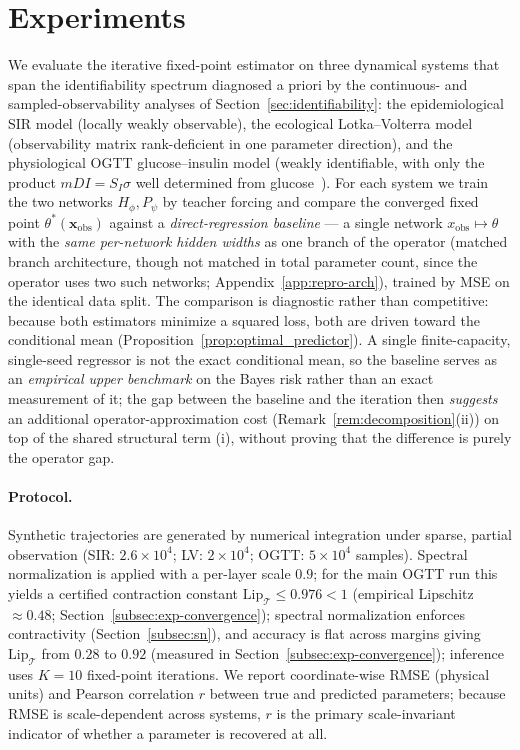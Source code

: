 \section{Experiments}
\label{sec:experiments}

We evaluate the iterative fixed-point estimator on three dynamical systems that span the
identifiability spectrum diagnosed a priori by the continuous- and sampled-observability analyses of
Section~\ref{sec:identifiability}: the epidemiological SIR model (locally weakly observable), the
ecological Lotka--Volterra model (observability matrix rank-deficient in one parameter direction),
and the physiological OGTT glucose--insulin model (weakly identifiable, with only the product
$mDI=S_I\sigma$ well determined from glucose~\cite{ha2025disposition}). For each system we train the two networks $H_\phi,P_\psi$
by teacher forcing and compare the converged fixed point $\theta^*(\mathbf{x}_\mathrm{obs})$ against a
\emph{direct-regression baseline} --- a single network $x_\mathrm{obs}\mapsto\theta$ with the \emph{same
per-network hidden widths} as one branch of the operator (matched branch architecture, though not matched in
total parameter count, since the operator uses two such networks; Appendix~\ref{app:repro-arch}), trained by
MSE on the identical data split. The comparison is diagnostic rather than
competitive: because both estimators minimize a squared loss, both are driven toward the conditional
mean (Proposition~\ref{prop:optimal_predictor}). A single finite-capacity, single-seed regressor is
not the exact conditional mean, so the baseline serves as an \emph{empirical upper benchmark} on the
Bayes risk rather than an exact measurement of it; the gap between the baseline and the iteration then
\emph{suggests} an additional operator-approximation cost (Remark~\ref{rem:decomposition}(ii)) on top of
the shared structural term (i), without proving that the difference is purely the operator gap.

\paragraph{Protocol.} Synthetic trajectories are generated by numerical integration under sparse,
partial observation (SIR: $2.6\times10^4$; LV: $2\times10^4$; OGTT: $5\times10^4$ samples). Spectral
normalization is applied with a per-layer scale $0.9$; for the main OGTT run this yields a certified
contraction constant $\mathrm{Lip}_\mathcal{T}\le0.976<1$ (empirical Lipschitz $\approx0.48$;
Section~\ref{subsec:exp-convergence}); spectral normalization enforces contractivity
(Section~\ref{subsec:sn}), and accuracy is flat across margins giving $\mathrm{Lip}_\mathcal{T}$ from
$0.28$ to $0.92$ (measured in Section~\ref{subsec:exp-convergence}); inference uses $K=10$
fixed-point iterations. We report coordinate-wise RMSE (physical units) and Pearson correlation $r$ between true
and predicted parameters; because RMSE is scale-dependent across systems, $r$ is the primary
scale-invariant indicator of whether a parameter is recovered at all.

